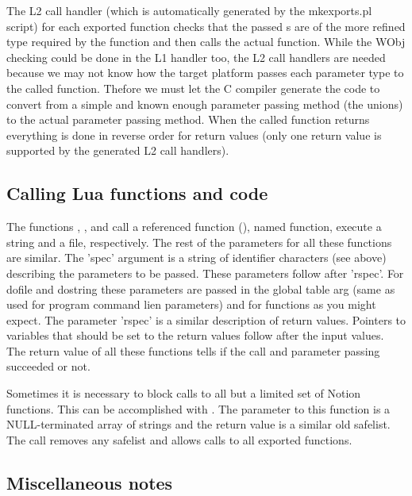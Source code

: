 The L2 call handler (which is automatically generated by the mkexports.pl
script) for each exported function checks that the passed s
are of the more refined type required by the function and then calls the
actual function. While the WObj checking could be done in the L1 handler
too, the L2 call handlers are needed because we may not know how the target
platform passes each parameter type to the called function. Thefore we
must let the C compiler generate the code to convert from a simple and
known enough parameter passing method (the unions) to the actual
parameter passing method. When the called function returns everything
is done in reverse order for return values (only one return value is
supported by the generated L2 call handlers).


\subsection{Calling Lua functions and code}
\label{sec:calling}

The functions
,
,
 and
call a referenced function (), named function, execute a
string and a file, respectively. The rest of the parameters for all these
functions are similar. The 'spec' argument is a string of identifier
characters (see above) describing the parameters to be passed. These
parameters follow after 'rspec'. For dofile and dostring these parameters
are passed in the global table arg (same as used for program command
lien parameters) and for functions as you might expect. The parameter
'rspec' is a similar description of return values. Pointers to variables
that should be set to the return values follow after the input values.
The return value of all these functions tells if the call and parameter
passing succeeded or not.

Sometimes it is necessary to block calls to all but a limited set of
Notion functions. This can be accomplished with
.
The parameter to this function is a NULL-terminated array of strings
and the return value is a similar old safelist.
The call  removes any safelist and allows
calls to all exported functions.


\subsection{Miscellaneous notes}

